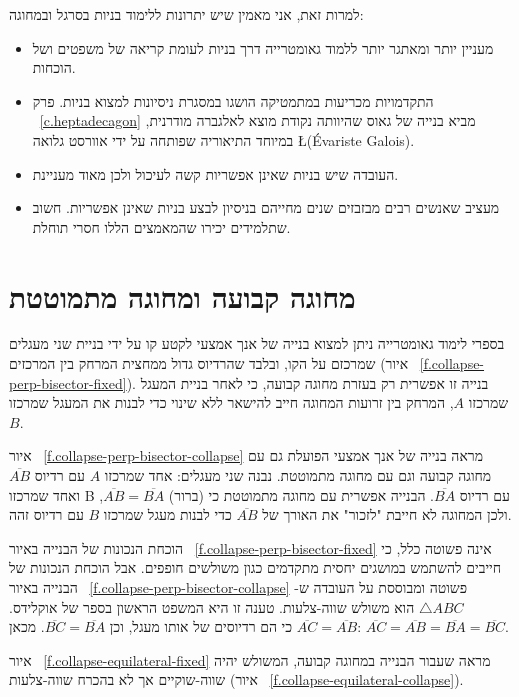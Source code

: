 למרות זאת, אני מאמין שיש יתרונות ללימוד בניות בסרגל ובמחוגה:
\begin{itemize}
\item
מעניין יותר ומאתגר יותר ללמוד גאומטרייה דרך בניות לעומת קריאה של משפטים ושל הוכחות.
\item
התקדמויות מכריעות במתמטיקה הושגו במסגרת ניסיונות למצוא בניות. פרק%
~\ref{c.heptadecagon}
מביא בנייה של גאוס 
שהיוותה נקודת מוצא לאלגברה מודרנית, במיוחד התיאוריה שפותחה על ידי אוורסט גלואה 
\L{(\'{E}variste Galois)}.
\item
העובדה שיש בניות שאינן אפשריות קשה לעיכול ולכן מאוד מעניינת.
\item
מעציב שאנשים רבים מבזבזים שנים מחייהם בניסיון לבצע בניות שאינן אפשריות. חשוב שתלמידים יכירו שהמאמצים הללו חסרי תוחלת.
\end{itemize}



\section{מחוגה קבועה ומחוגה מתמוטטת}\label{s.collapse}

בספרי לימוד גאומטרייה ניתן למצוא בנייה של אנך אמצעי לקטע קו על ידי בניית שני מעגלים שמרכזם על הקו, ובלבד שהרדיוס גדול ממחצית המרחק בין המרכזים 
(איור%
~\ref{f.collapse-perp-bisector-fixed}).
בנייה זו אפשרית רק בעזרת מחוגה קבועה, כי לאחר בניית המעגל שמרכזו 
$A$,
המרחק בין זרועות המחוגה חייב להישאר ללא שינוי כדי לבנות את המעגל שמרכזו 
$B$.

איור%
~\ref{f.collapse-perp-bisector-collapse}
מראה בנייה של אנך אמצעי הפועלת גם עם מחוגה קבועה וגם עם מחוגה מתמוטטת. נבנה שני מעגלים: אחד שמרכזו 
$A$
עם רדיוס
$\overline{AB}$
ואחד שמרכזו B עם רדיוס
$\overline{BA}$.
הבנייה אפשרית עם מחוגה מתמוטטת כי (ברור)
$\overline{AB}=\overline{BA}$,
ולכן המחוגה לא חייבת "לזכור" את האורך של
$\overline{AB}$
כדי לבנות מעגל שמרכזו 
$B$
עם רדיוס זהה.

הוכחת הנכונות של הבנייה באיור%
~\ref{f.collapse-perp-bisector-fixed}
אינה פשוטה כלל, כי חייבים להשתמש במושגים יחסית מתקדמים כגון משולשים חופפים. אבל הוכחת הנכונות של הבנייה באיור%
~\ref{f.collapse-perp-bisector-collapse}
פשוטה ומבוססת על העובדה ש-%
$\triangle ABC$
הוא משולש שווה-צלעות. טענה זו היא המשפט הראשון בספר של אוקלידס. 
$\overline{AC}=\overline{AB}$
כי הם רדיוסים של אותו מעגל, וכן
$\overline{BC}=\overline{BA}$.
מכאן:
$\overline{AC} = \overline{AB} = \overline{BA} = \overline{BC}$.

איור%
~\ref{f.collapse-equilateral-fixed}
מראה שעבור הבנייה במחוגה קבועה, המשולש יהיה שווה-שוקיים אך לא בהכרח שווה-צלעות 
(איור~
\ref{f.collapse-equilateral-collapse}).

